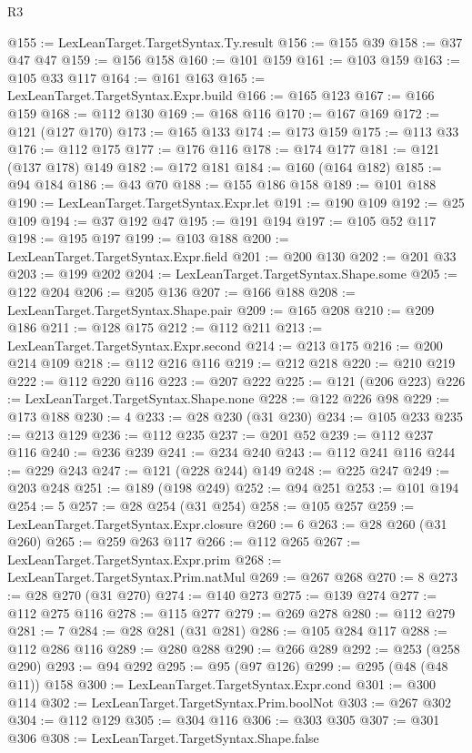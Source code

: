 \begin{lexlean}{R3}
\begin{coremodule}
@155 := LexLeanTarget.TargetSyntax.Ty.result
@156 := @155 @39
@158 := @37 @47 @47
@159 := @156 @158
@160 := @101 @159
@161 := @103 @159
@163 := @105 @33 @117
@164 := @161 @163
@165 := LexLeanTarget.TargetSyntax.Expr.build
@166 := @165 @123
@167 := @166 @159
@168 := @112 @130
@169 := @168 @116
@170 := @167 @169
@172 := @121 (@127 @170)
@173 := @165 @133
@174 := @173 @159
@175 := @113 @33
@176 := @112 @175
@177 := @176 @116
@178 := @174 @177
@181 := @121 (@137 @178) @149
@182 := @172 @181
@184 := @160 (@164 @182)
@185 := @94 @184
@186 := @43 @70
@188 := @155 @186 @158
@189 := @101 @188
@190 := LexLeanTarget.TargetSyntax.Expr.let
@191 := @190 @109
@192 := @25 @109
@194 := @37 @192 @47
@195 := @191 @194
@197 := @105 @52 @117
@198 := @195 @197
@199 := @103 @188
@200 := LexLeanTarget.TargetSyntax.Expr.field
@201 := @200 @130
@202 := @201 @33
@203 := @199 @202
@204 := LexLeanTarget.TargetSyntax.Shape.some
@205 := @122 @204
@206 := @205 @136
@207 := @166 @188
@208 := LexLeanTarget.TargetSyntax.Shape.pair
@209 := @165 @208
@210 := @209 @186
@211 := @128 @175
@212 := @112 @211
@213 := LexLeanTarget.TargetSyntax.Expr.second
@214 := @213 @175
@216 := @200 @214 @109
@218 := @112 @216 @116
@219 := @212 @218
@220 := @210 @219
@222 := @112 @220 @116
@223 := @207 @222
@225 := @121 (@206 @223)
@226 := LexLeanTarget.TargetSyntax.Shape.none
@228 := @122 @226 @98
@229 := @173 @188
@230 := 4
@233 := @28 @230 (@31 @230)
@234 := @105 @233
@235 := @213 @129
@236 := @112 @235
@237 := @201 @52
@239 := @112 @237 @116
@240 := @236 @239
@241 := @234 @240
@243 := @112 @241 @116
@244 := @229 @243
@247 := @121 (@228 @244) @149
@248 := @225 @247
@249 := @203 @248
@251 := @189 (@198 @249)
@252 := @94 @251
@253 := @101 @194
@254 := 5
@257 := @28 @254 (@31 @254)
@258 := @105 @257
@259 := LexLeanTarget.TargetSyntax.Expr.closure
@260 := 6
@263 := @28 @260 (@31 @260)
@265 := @259 @263 @117
@266 := @112 @265
@267 := LexLeanTarget.TargetSyntax.Expr.prim
@268 := LexLeanTarget.TargetSyntax.Prim.natMul
@269 := @267 @268
@270 := 8
@273 := @28 @270 (@31 @270)
@274 := @140 @273
@275 := @139 @274
@277 := @112 @275 @116
@278 := @115 @277
@279 := @269 @278
@280 := @112 @279
@281 := 7
@284 := @28 @281 (@31 @281)
@286 := @105 @284 @117
@288 := @112 @286 @116
@289 := @280 @288
@290 := @266 @289
@292 := @253 (@258 @290)
@293 := @94 @292
@295 := @95 (@97 @126)
@299 := @295 (@48 (@48 @11)) @158
@300 := LexLeanTarget.TargetSyntax.Expr.cond
@301 := @300 @114
@302 := LexLeanTarget.TargetSyntax.Prim.boolNot
@303 := @267 @302
@304 := @112 @129
@305 := @304 @116
@306 := @303 @305
@307 := @301 @306
@308 := LexLeanTarget.TargetSyntax.Shape.false

\end{coremodule}
\end{lexlean}

